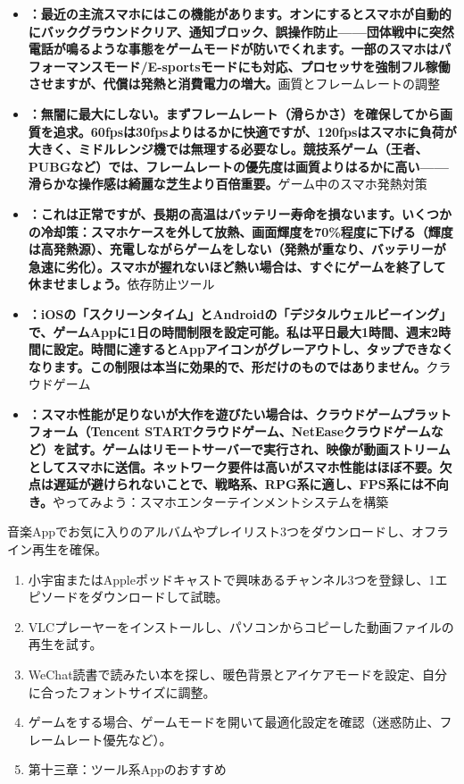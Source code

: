 \begin{itemize}
  \item \textbf{：最近の主流スマホにはこの機能があります。オンにするとスマホが自動的にバックグラウンドクリア、通知ブロック、誤操作防止——団体戦中に突然電話が鳴るような事態をゲームモードが防いでくれます。一部のスマホはパフォーマンスモード/E-sportsモードにも対応、プロセッサを強制フル稼働させますが、代償は発熱と消費電力の増大。}画質とフレームレートの調整
  \item \textbf{：無闇に最大にしない。まずフレームレート（滑らかさ）を確保してから画質を追求。60fpsは30fpsよりはるかに快適ですが、120fpsはスマホに負荷が大きく、ミドルレンジ機では無理する必要なし。競技系ゲーム（王者、PUBGなど）では、フレームレートの優先度は画質よりはるかに高い——滑らかな操作感は綺麗な芝生より百倍重要。}ゲーム中のスマホ発熱対策
  \item \textbf{：これは正常ですが、長期の高温はバッテリー寿命を損ないます。いくつかの冷却策：スマホケースを外して放熱、画面輝度を70\%程度に下げる（輝度は高発熱源）、充電しながらゲームをしない（発熱が重なり、バッテリーが急速に劣化）。スマホが握れないほど熱い場合は、すぐにゲームを終了して休ませましょう。}依存防止ツール
  \item \textbf{：iOSの「スクリーンタイム」とAndroidの「デジタルウェルビーイング」で、ゲームAppに1日の時間制限を設定可能。私は平日最大1時間、週末2時間に設定。時間に達するとAppアイコンがグレーアウトし、タップできなくなります。この制限は本当に効果的で、形だけのものではありません。}クラウドゲーム
  \item \textbf{：スマホ性能が足りないが大作を遊びたい場合は、クラウドゲームプラットフォーム（Tencent STARTクラウドゲーム、NetEaseクラウドゲームなど）を試す。ゲームはリモートサーバーで実行され、映像が動画ストリームとしてスマホに送信。ネットワーク要件は高いがスマホ性能はほぼ不要。欠点は遅延が避けられないことで、戦略系、RPG系に適し、FPS系には不向き。}やってみよう：スマホエンターテインメントシステムを構築
\end{itemize}

\begin{tcbpractice}{音楽Appでお気に入りのアルバムやプレイリスト3つをダウンロードし、オフライン再生を確保。}
\begin{enumerate}
  \item 小宇宙またはAppleポッドキャストで興味あるチャンネル3つを登録し、1エピソードをダウンロードして試聴。
  \item VLCプレーヤーをインストールし、パソコンからコピーした動画ファイルの再生を試す。
  \item WeChat読書で読みたい本を探し、暖色背景とアイケアモードを設定、自分に合ったフォントサイズに調整。
  \item ゲームをする場合、ゲームモードを開いて最適化設定を確認（迷惑防止、フレームレート優先など）。
  \item 第十三章：ツール系Appのおすすめ
\end{enumerate}

\end{tcbpractice}
